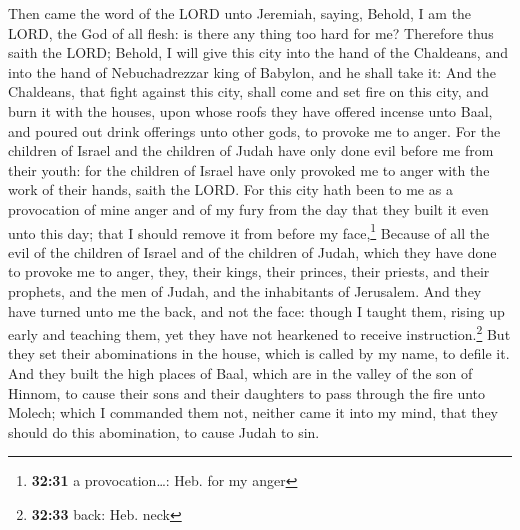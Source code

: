  Then came the word of the LORD unto Jeremiah, saying,
 Behold, I am the LORD, the God of all flesh: is there
any thing too hard for me?  Therefore thus saith the
LORD; Behold, I will give this city into the hand of the Chaldeans, and
into the hand of Nebuchadrezzar king of Babylon, and he shall take it:
 And the Chaldeans, that fight against this city, shall
come and set fire on this city, and burn it with the houses, upon whose
roofs they have offered incense unto Baal, and poured out drink
offerings unto other gods, to provoke me to anger.  For
the children of Israel and the children of Judah have only done evil
before me from their youth: for the children of Israel have only
provoked me to anger with the work of their hands, saith the LORD.
 For this city hath been to me as a provocation of mine
anger and of my fury from the day that they built it even unto this day;
that I should remove it from before my face,\footnote{\textbf{32:31} a
  provocation\ldots: Heb. for my anger}  Because of all
the evil of the children of Israel and of the children of Judah, which
they have done to provoke me to anger, they, their kings, their princes,
their priests, and their prophets, and the men of Judah, and the
inhabitants of Jerusalem.  And they have turned unto me
the back, and not the face: though I taught them, rising up early and
teaching them, yet they have not hearkened to receive
instruction.\footnote{\textbf{32:33} back: Heb. neck} 
But they set their abominations in the house, which is called by my
name, to defile it.  And they built the high places of
Baal, which are in the valley of the son of Hinnom, to cause their sons
and their daughters to pass through the fire unto Molech; which I
commanded them not, neither came it into my mind, that they should do
this abomination, to cause Judah to sin.

